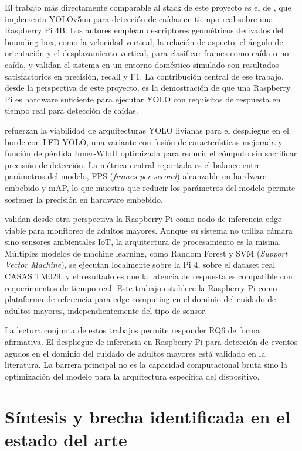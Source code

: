El trabajo más directamente comparable al stack de este proyecto es el de \textcite{Giri2025}, que implementa YOLOv5nu para detección de caídas en tiempo real sobre una Raspberry Pi 4B.
Los autores emplean descriptores geométricos derivados del bounding box, como la velocidad vertical, la relación de aspecto, el ángulo de orientación y el desplazamiento vertical, para clasificar frames como caída o no-caída, y validan el sistema en un entorno doméstico simulado con resultados satisfactorios en precisión, recall y F1.
La contribución central de ese trabajo, desde la perspectiva de este proyecto, es la demostración de que una Raspberry Pi es hardware suficiente para ejecutar YOLO con requisitos de respuesta en tiempo real para detección de caídas.

\textcite{Wang2025} refuerzan la viabilidad de arquitecturas YOLO livianas para el despliegue en el borde con LFD-YOLO, una variante con fusión de características mejorada y función de pérdida Inner-WIoU optimizada para reducir el cómputo sin sacrificar precisión de detección.
La métrica central reportada es el balance entre parámetros del modelo, FPS (\textit{frames per second}) alcanzable en hardware embebido y mAP, lo que muestra que reducir los parámetros del modelo permite sostener la precisión en hardware embebido.

\textcite{Ali2025} validan desde otra perspectiva la Raspberry Pi como nodo de inferencia edge viable para monitoreo de adultos mayores.
Aunque su sistema no utiliza cámara sino sensores ambientales IoT, la arquitectura de procesamiento es la misma.
Múltiples modelos de machine learning, como Random Forest y SVM (\textit{Support Vector Machine}), se ejecutan localmente sobre la Pi 4, sobre el dataset real CASAS TM029, y el resultado es que la latencia de respuesta es compatible con requerimientos de tiempo real.
Este trabajo establece la Raspberry Pi como plataforma de referencia para edge computing en el dominio del cuidado de adultos mayores, independientemente del tipo de sensor.

La lectura conjunta de estos trabajos permite responder RQ6 de forma afirmativa.
El despliegue de inferencia en Raspberry Pi para detección de eventos agudos en el dominio del cuidado de adultos mayores está validado en la literatura.
La barrera principal no es la capacidad computacional bruta sino la optimización del modelo para la arquitectura específica del dispositivo.

\section{Síntesis y brecha identificada en el estado del arte}
\label{sec:brecha}

